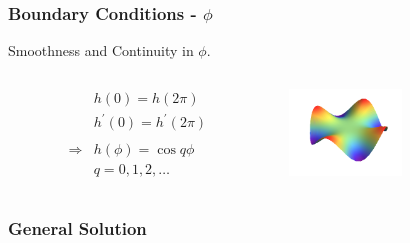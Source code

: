 \documentclass{beamer}
\newenvironment{variableblock}[3]{%
  \setbeamercolor{block body}{#2}
  \setbeamercolor{block title}{#3}
  \begin{block}{#1}}{\end{block}}
\begin{document}
\begin{frame}[t]
 \frametitle{Boundary Conditions - $\phi$}
 \begin{exampleblock}{Smoothness and Continuity in $\phi$.}
 \begin{columns}
 \begin{column}{.65\textwidth}
  \begin{align}
   &h(0)=h(2\pi)\nonumber\\
   &h^\prime(0)=h^\prime(2\pi)\nonumber\\
   &\mbox{}\nonumber\\
   \Rightarrow &h(\phi)=\cos q\phi\\
   &q=0,1,2,\ldots\nonumber
  \end{align}
  \end{column}
  \begin{column}{.35\textwidth}
   \centering
\includegraphics[width = 3.0cm]{Diagrams/Presentation/BoundaryConditions/cylinderphi.png}
  \end{column}

  \end{columns}
 \end{exampleblock}
\end{frame}

\begin{frame}[t]
\frametitle{General Solution}
\end{frame}
\end{document}

